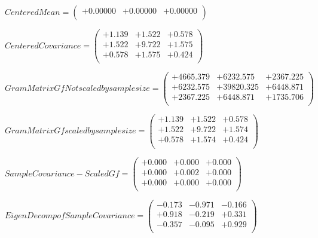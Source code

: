 \documentclass[9pt]{article}
\theoremstyle{plain}
\theoremstyle{definition}
\theoremstyle{remark}
\numberwithin{equation}{section}
\begin{document}
$Centered Mean = \left(
\begin{array}{
ccc}
+0.00000 & +0.00000 & +0.00000 \\
\end{array}
\right)$ \newline 

$Centered Covariance = \left(
\begin{array}{
ccc}
+1.139 & +1.522 & +0.578 \\
+1.522 & +9.722 & +1.575 \\
+0.578 & +1.575 & +0.424 \\
\end{array}
\right)$ \newline 

$Gram Matrix Gf Not scaled by sample size = \left(
\begin{array}{
ccc}
+4665.379 & +6232.575 & +2367.225 \\
+6232.575 & +39820.325 & +6448.871 \\
+2367.225 & +6448.871 & +1735.706 \\
\end{array}
\right)$ \newline 

$Gram Matrix Gf  scaled by sample size = \left(
\begin{array}{
ccc}
+1.139 & +1.522 & +0.578 \\
+1.522 & +9.722 & +1.574 \\
+0.578 & +1.574 & +0.424 \\
\end{array}
\right)$ \newline 

$SampleCovariance - Scaled Gf = \left(
\begin{array}{
ccc}
+0.000 & +0.000 & +0.000 \\
+0.000 & +0.002 & +0.000 \\
+0.000 & +0.000 & +0.000 \\
\end{array}
\right)$ \newline 

$EigenDecomp of SampleCovariance = \left(
\begin{array}{
ccc}
-0.173 & -0.971 & -0.166 \\
+0.918 & -0.219 & +0.331 \\
-0.357 & -0.095 & +0.929 \\
\end{array}
\right)$ \newline 
\end{document}
